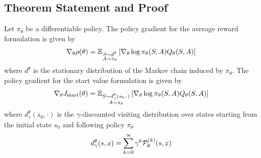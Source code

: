 \subsection{Theorem Statement and Proof}
\begin{theorem}
\label{thm:risk_neutral_policy_gradient}
	Let $\pi_\theta$ be a differentiable policy. The policy gradient for the average reward formulation is given by
	\begin{equation}
		\nabla_\theta \rho(\theta) =
		\E[\substack{S \sim d^\theta\\A \sim \pi_\theta}]{\nabla_\theta\log
		\pi_\theta(S,A) Q_{\theta}(S, A)}
	\end{equation}
	where $d^\theta$ is the stationary distribution of the Markov chain induced by $\pi_\theta$. The policy gradient for the start value formulation is given by
	\begin{equation}
		\nabla_\theta J_{\text{start}}(\theta) =
		\E[\substack{S \sim d_\gamma^\theta(s_0, \cdot)\\A \sim \pi_\theta}]{\nabla_\theta\log
		\pi_\theta(S,A) Q_{\theta}(S, A)}
	\end{equation}
	where $d_\gamma^\theta(s_0, \cdot)$ is the $\gamma$-discounted visiting distribution over states starting from the initial state $s_0$ and following policy $\pi_\theta$
		\begin{equation}
			d_\gamma^\theta(s, x) = \sum_{k=0}^{\infty} \gamma^k \calP_\theta^{(k)}(s, x)
		\end{equation}
\end{theorem}
